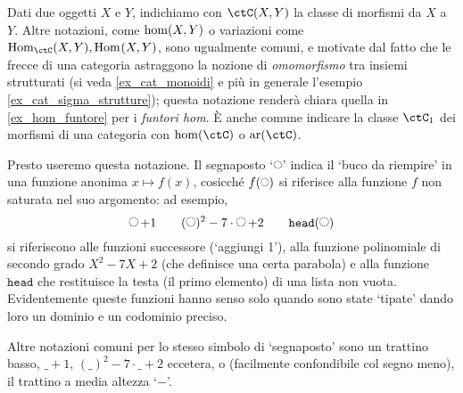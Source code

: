 \begin{notation}
	Dati due oggetti \(X\) e \(Y\), indichiamo con \(\Hom{\ctC}(X,Y)\) la classe di morfismi da \(X\) a \(Y\). Altre notazioni, come \(\hom(X,Y)\) o variazioni come \(\vvarHom{\ctC}(X,Y),\vvarHom{}(X,Y)\), sono ugualmente comuni, e motivate dal fatto che le frecce di una categoria astraggono la nozione di \emph{omomorfismo} tra insiemi strutturati (si veda \ref{ex_cat_monoidi} e più in generale l'esempio \ref{ex_cat_sigma_strutture}); questa notazione renderà chiara quella in \ref{ex_hom_funtore} per i \emph{funtori hom}. \`E anche comune indicare la classe \(\ctC_1\) dei morfismi di una categoria con \(\hom(\ctC)\) o \(\mathrm{ar}(\ctC)\).
\end{notation}
\begin{notation}
	Presto useremo questa notazione. Il segnaposto `\(\blank\)' indica il `buco da riempire' in una funzione anonima \(x\mapsto f(x)\), cosicché \(f(\blank)\) si riferisce alla funzione \(f\) non saturata nel suo argomento: ad esempio,
	\[\blank+1 \qquad (\blank)^2 -7\cdot\blank + 2 \qquad \texttt{head}(\blank)\]
	si riferiscono alle funzioni successore (`aggiungi 1'), alla funzione polinomiale di secondo grado \(X^2-7X+2\) (che definisce una certa parabola) e alla funzione \(\texttt{head}\) che restituisce la testa (il primo elemento) di una lista non vuota. Evidentemente queste funzioni hanno senso solo quando sono state `tipate' dando loro un dominio e un codominio preciso.

	Altre notazioni comuni per lo stesso simbolo di `segnaposto' sono un trattino basso, \(\_+1\), \((\_)^2 -7\cdot\_ + 2\) eccetera, o (facilmente confondibile col segno meno), il trattino a media altezza `\(-\)'.
\end{notation}
